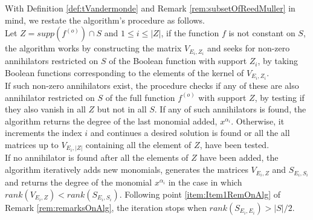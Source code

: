 \documentclass[11pt]{llncs}
\begin{document}
With Definition \ref{def:tVandermonde} and Remark \ref{rem:subsetOfReedMuller} in mind, we restate the algorithm's procedure as follows.\\
Let $Z = supp\left(f^{(o)}\right) \cap S$ and $1\leq i \leq |Z|$, if the function $f$ is not constant on $S$, the algorithm works by constructing the matrix $V_{E_i, Z_i}$ and seeks for non-zero annihilators restricted on $S$ of the Boolean function with support $Z_i$, by taking Boolean functions corresponding to the elements of the kernel of $V_{E_i, Z_i}$.\\
If such non-zero annihilators exist, the procedure checks if any of these are also annihilator restricted on $S$ of the full function $f^{(o)}$ with support $Z$, by testing if they also vanish in all $Z$ but not in all $S$. If any of such annihilators is found, the algorithm returns the degree of the last monomial added, $x^{\alpha_i}$. Otherwise, it increments the index $i$ and continues a desired solution is found or all the all matrices up to $V_{E_i, |Z|}$ containing all the element of $Z$, have been tested.\\
If no annihilator is found after all the elements of $Z$ have been added, the algorithm iteratively adds new monomials, generates the matrices $V_{E_i, Z}$ and $S_{E_i, S_i}$ and returns the degree of the monomial $x^{\alpha_i}$ in the case in which $rank\left(V_{E_i, Z}\right) < rank\left(S_{E_i, S_i}\right)$. Following point \ref{item:Item1RemOnAlg} of Remark \ref{rem:remarksOnAlg}, the iteration stops when $rank\left(S_{E_i, E_i}\right) > |S| / 2$.\\
\end{document}
